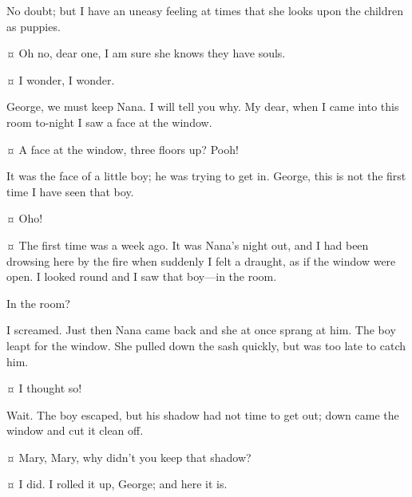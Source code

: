 \begin{drama}
\mrdarlingspeaks
No doubt; but I have an uneasy feeling at times that she looks upon the children as puppies.

\mrsdarlingspeaks {}¤
Oh no, dear one, I am sure she knows they have souls.

\mrdarlingspeaks {}¤
I wonder, I wonder.


\mrsdarlingspeaks
George, we must keep Nana.
I will tell you why.
My dear, when I came into this room to-night I saw a face at the window.

\mrdarlingspeaks {}¤
A face at the window, three floors up?
Pooh!

\mrsdarlingspeaks
It was the face of a little boy; he was trying to get in.
George, this is not the first time I have seen that boy.

\mrdarlingspeaks {}¤
Oho!

\mrsdarlingspeaks {}¤
The first time was a week ago.
It was Nana's night out, and I had been drowsing here by the fire when suddenly I felt a draught,
as if the window were open.
I looked round and I saw that boy—in the room.

\mrdarlingspeaks
In the room?

\mrsdarlingspeaks
I screamed.
Just then Nana came back and she at once sprang at him.
The boy leapt for the window.
She pulled down the sash quickly, but was too late to catch him.

\mrdarlingspeaks {}¤
I thought so!

\mrsdarlingspeaks
Wait.
The boy escaped, but his shadow had not time to get out; down came the window and cut it clean off.

\mrdarlingspeaks {}¤
Mary, Mary, why didn't you keep that shadow?

\mrsdarlingspeaks {}¤
I did.
I rolled it up, George; and here it is.



\end{drama}
